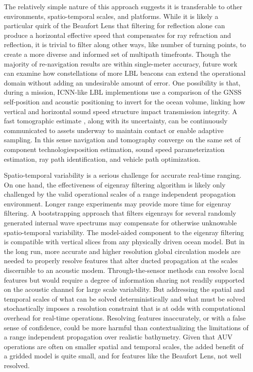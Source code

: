 The relatively simple nature of this approach suggests it is transferable to other environments, spatio-temporal scales, and platforms.
While it is likely a particular quirk of the Beaufort Lens that filtering for reflection alone can produce a horizontal effective speed that compensates for ray refraction and reflection, it is trivial to filter along other ways, like number of turning points, to create a more diverse and informed set of multipath timefronts.
Though the majority of re-navigation results are within single-meter accuracy, future work can examine how constellations of more LBL beacons can extend the operational domain without adding an undesirable amount of error.
One possibility is that, during a mission, ICNN-like LBL implementions use a comparison of the GNSS self-position and acoustic positioning to invert for the ocean volume, linking how vertical and horizontal sound speed structure impact transmission integrity.
 A fast tomographic estimate \citep{deffenbaugh_optimal_1997,Elisseeff2002}, along with its uncertainty, can be continuously communicated to assets underway to maintain contact or enable adaptive sampling.
In this sense navigation and tomography converge on the same set of component technologies\textemdash position estimation, sound speed parameterization estimation, ray path identification, and vehicle path optimization.

Spatio-temporal variability is a serious challenge for accurate real-time ranging.
On one hand, the effectiveness of eigenray filtering algorithm is likely only challenged by the valid operational scales of a range independent propagation environment.
Longer range experiments may provide more time for eigenray filtering.
A bootstrapping approach that filters eigenrays for several randomly generated internal wave spectrums may compensate for otherwise unknowable spatio-temporal variability.
The model-aided component to the eigenray filtering is compatible with vertical slices from any physically driven ocean model.
But in the long run, more accurate and higher resolution global circulation models are needed to properly resolve features that alter ducted propagation at the scales discernible to an acoustic modem.
Through-the-sensor methods can resolve local features but would require a degree of information sharing not readily supported on the acoustic channel for large scale variability.
But addressing the spatial and temporal scales of what can be solved deterministically and what must be solved stochastically imposes a resolution constraint that is at odds with computational overhead for real-time operations.
Resolving features inaccurately, or with a false sense of confidence, could be more harmful than contextualizing the limitations of a range independent propagation over realistic bathymetry.
Given that AUV operations are often on smaller spatial and temporal scales, the added benefit of a gridded model is quite small, and for features like the Beaufort Lens, not well resolved.

